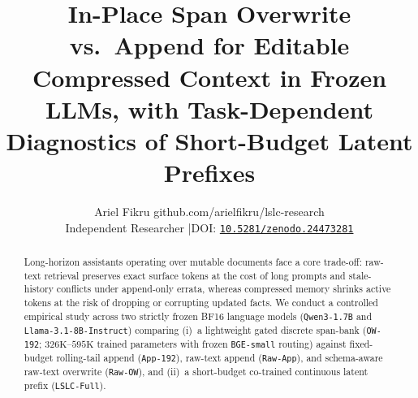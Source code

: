 \documentclass[10pt]{article}
\title{In-Place Span Overwrite vs.\ Append for Editable Compressed Context in Frozen LLMs, with Task-Dependent Diagnostics of Short-Budget Latent Prefixes}
\author{\name Ariel Fikru \email github.com/arielfikru/lslc-research \\
\addr Independent Researcher \quad|\quad DOI: \href{https://doi.org/10.5281/zenodo.24473281}{\texttt{10.5281/zenodo.24473281}}}
\renewcommand{\_}{\origunderscore\allowbreak}
\begin{document}
\setlength\aftertitskip{0.2in}
\maketitle
\vspace{-1.2em}

{\renewcommand{\thefootnote}{}}

\begin{abstract}
Long-horizon assistants operating over mutable documents face a core trade-off: raw-text retrieval preserves exact surface tokens at the cost of long prompts and stale-history conflicts under append-only errata, whereas compressed memory shrinks active tokens at the risk of dropping or corrupting updated facts. We conduct a controlled empirical study across two strictly frozen BF16 language models (\texttt{Qwen3-1.7B} and \texttt{Llama-3.1-8B-Instruct}) comparing (i)~a lightweight gated discrete span-bank (\texttt{OW-192}; $326\text{K}$--$595\text{K}$ trained parameters with frozen \texttt{BGE-small} routing) against fixed-budget rolling-tail append (\texttt{App-192}), raw-text append (\texttt{Raw-App}), and schema-aware raw-text overwrite (\texttt{Raw-OW}), and (ii)~a short-budget co-trained continuous latent prefix (\texttt{LSLC-Full}).


\end{abstract}
\end{document}
